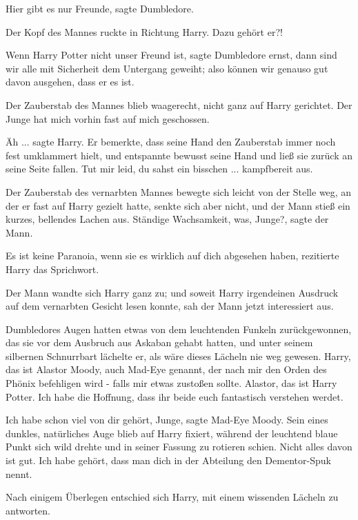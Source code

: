 \glqq Hier gibt es nur Freunde\grqq{}, sagte Dumbledore.

Der Kopf des Mannes ruckte in Richtung Harry. \glqq Dazu gehört er?!\grqq{}

\glqq Wenn Harry Potter nicht unser Freund ist\grqq{}, sagte Dumbledore ernst,
\glqq dann sind wir alle mit Sicherheit dem Untergang geweiht; also können wir
genauso gut davon ausgehen, dass er es ist.\grqq{}

Der Zauberstab des Mannes blieb waagerecht, nicht ganz auf Harry gerichtet.
\glqq Der Junge hat mich vorhin fast auf mich geschossen.\grqq{}

\glqq Äh ...\grqq{} sagte Harry. Er bemerkte, dass seine Hand den Zauberstab
immer noch fest umklammert hielt, und entspannte bewusst seine Hand und ließ sie
zurück an seine Seite fallen. \glqq Tut mir leid, du sahst ein bisschen ...
kampfbereit aus.\grqq{}

Der Zauberstab des vernarbten Mannes bewegte sich leicht von der Stelle weg, an
der er fast auf Harry gezielt hatte, senkte sich aber nicht, und der Mann stieß
ein kurzes, bellendes Lachen aus. \glqq Ständige Wachsamkeit, was,
Junge?\grqq{}, sagte der Mann.

\glqq Es ist keine Paranoia, wenn sie es wirklich auf dich abgesehen
haben\grqq{}, rezitierte Harry das Sprichwort.

Der Mann wandte sich Harry ganz zu; und soweit Harry irgendeinen Ausdruck auf
dem vernarbten Gesicht lesen konnte, sah der Mann jetzt interessiert aus.

Dumbledores Augen hatten etwas von dem leuchtenden Funkeln zurückgewonnen, das
sie vor dem Ausbruch aus Askaban gehabt hatten, und unter seinem silbernen
Schnurrbart lächelte er, als wäre dieses Lächeln nie weg gewesen. \glqq Harry,
das ist Alastor Moody, auch Mad-Eye genannt, der nach mir den Orden des Phönix
befehligen wird - falls mir etwas zustoßen sollte. Alastor, das ist Harry
Potter. Ich habe die Hoffnung, dass ihr beide euch fantastisch verstehen
werdet.\grqq{}

\glqq Ich habe schon viel von dir gehört, Junge\grqq{}, sagte Mad-Eye Moody.
Sein eines dunkles, natürliches Auge blieb auf Harry fixiert, während der
leuchtend blaue Punkt sich wild drehte und in seiner Fassung zu rotieren schien.
\glqq Nicht alles davon ist gut. Ich habe gehört, dass man dich in der Abteilung
den Dementor-Spuk nennt.\grqq{}

Nach einigem Überlegen entschied sich Harry, mit einem wissenden Lächeln zu
antworten.

